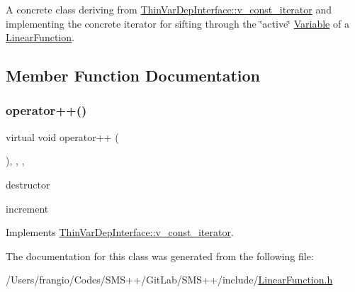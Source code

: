 A concrete class deriving from \mbox{\hyperlink{class_s_m_spp__di__unipi__it_1_1_thin_var_dep_interface_1_1v__const__iterator}{Thin\+Var\+Dep\+Interface\+::v\+\_\+const\+\_\+iterator}} and implementing the concrete iterator for sifting through the \char`\"{}active\char`\"{} \mbox{\hyperlink{class_s_m_spp__di__unipi__it_1_1_variable}{Variable}} of a \mbox{\hyperlink{class_s_m_spp__di__unipi__it_1_1_linear_function}{Linear\+Function}}. 

\subsection{Member Function Documentation}
\mbox{\label{class_s_m_spp__di__unipi__it_1_1_linear_function_1_1v__const__iterator_af860fe44bc54c0cbca8e733ab0e954e0}} 
\subsubsection{\texorpdfstring{operator++()}{operator++()}}
{\footnotesize\ttfamily virtual void operator++ (\begin{DoxyParamCaption}\item[{void}]{ }\end{DoxyParamCaption})\hspace{0.3cm}{\ttfamily [inline]}, {\ttfamily [final]}, {\ttfamily [override]}, {\ttfamily [virtual]}}



destructor 

increment 

Implements \mbox{\hyperlink{group___thin_var_dep_interface___c_l_a_s_s_e_s_ga79fc9d17094dc591d6b48bc296028d51}{Thin\+Var\+Dep\+Interface\+::v\+\_\+const\+\_\+iterator}}.



The documentation for this class was generated from the following file\+:\begin{DoxyCompactItemize}
\item 
/\+Users/frangio/\+Codes/\+S\+M\+S++/\+Git\+Lab/\+S\+M\+S++/include/\mbox{\hyperlink{_linear_function_8h}{Linear\+Function.\+h}}\end{DoxyCompactItemize}
